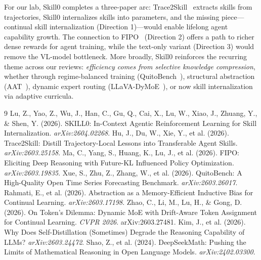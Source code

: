 \documentclass[11pt]{article}
\begin{document}
For our lab, Skill0 completes a three-paper arc: Trace2Skill~\cite{trace2skill} extracts skills from trajectories, Skill0 internalizes skills into parameters, and the missing piece---continual skill internalization (Direction 1)---would enable lifelong agent capability growth. The connection to FIPO~\cite{fipo} (Direction 2) offers a path to richer dense rewards for agent training, while the text-only variant (Direction 3) would remove the VL-model bottleneck. More broadly, Skill0 reinforces the recurring theme across our reviews: \textit{efficiency comes from selective knowledge compression}, whether through regime-balanced training (QuitoBench~\cite{quitobench}), structural abstraction (AAT~\cite{aat}), dynamic expert routing (LLaVA-DyMoE~\cite{dymoe}), or now skill internalization via adaptive curricula.

\begin{thebibliography}{9}
 Lu, Z., Yao, Z., Wu, J., Han, C., Gu, Q., Cai, X., Lu, W., Xiao, J., Zhuang, Y., \& Shen, Y. (2026). SKILL0: In-Context Agentic Reinforcement Learning for Skill Internalization. \textit{arXiv:2604.02268}.
 Hu, J., Du, W., Xie, Y., et al. (2026). Trace2Skill: Distill Trajectory-Local Lessons into Transferable Agent Skills. \textit{arXiv:2603.25158}.
 Ma, C., Yang, S., Huang, K., Lu, J., et al. (2026). FIPO: Eliciting Deep Reasoning with Future-KL Influenced Policy Optimization. \textit{arXiv:2603.19835}.
 Xue, S., Zhu, Z., Zhang, W., et al. (2026). QuitoBench: A High-Quality Open Time Series Forecasting Benchmark. \textit{arXiv:2603.26017}.
 Rahmati, E., et al. (2026). Abstraction as a Memory-Efficient Inductive Bias for Continual Learning. \textit{arXiv:2603.17198}.
 Zhao, C., Li, M., Lu, H., \& Gong, D. (2026). On Token's Dilemma: Dynamic MoE with Drift-Aware Token Assignment for Continual Learning. \textit{CVPR 2026}. arXiv:2603.27481.
 Kim, J., et al. (2026). Why Does Self-Distillation (Sometimes) Degrade the Reasoning Capability of LLMs? \textit{arXiv:2603.24472}.
 Shao, Z., et al. (2024). DeepSeekMath: Pushing the Limits of Mathematical Reasoning in Open Language Models. \textit{arXiv:2402.03300}.
\end{thebibliography}
\end{document}
